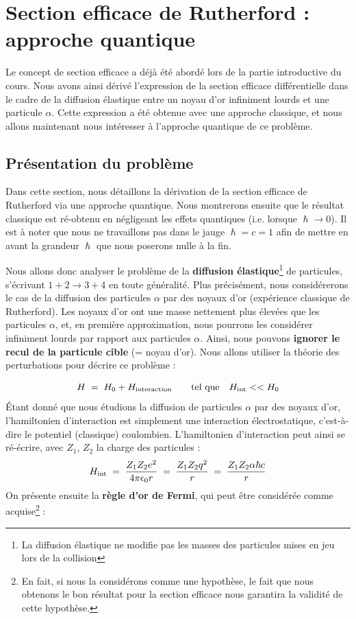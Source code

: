 

\section{Section efficace de Rutherford : approche quantique}

Le concept de section efficace a déjà été abordé lors de la partie introductive du cours. Nous avons ainsi dérivé l'expression de la section efficace différentielle dans le cadre de la diffusion élastique entre un noyau d'or infiniment lourds et une particule $\alpha$. Cette expression a été obtenue avec une approche classique, et nous allons maintenant nous intéresser à l'approche quantique de ce problème.

\subsection{Présentation du problème}

Dans cette section, nous détaillons la dérivation de la section efficace de Rutherford via une approche quantique. Nous montrerons ensuite que le résultat classique est ré-obtenu en négligeant les effets quantiques (i.e. lorsque $\hslash \rightarrow 0$). Il est à noter que nous ne travaillons pas dans le jauge $\hslash = c = 1$ afin de mettre en avant la grandeur $\hslash$ que nous poserons nulle à la fin.

Nous allons donc analyser le problème de la \textbf{diffusion élastique}\footnote{La diffusion élastique ne modifie pas les masses des particules mises en jeu lors de la collision} de particules, s'écrivant $1+2 \rightarrow 3+4$ en toute généralité. Plus précisément, nous considérerons le cas de la diffusion des particules $\alpha$ par des noyaux d'or (expérience classique de Rutherford). Les noyaux d'or ont une masse nettement plus élevées que les particules $\alpha$, et, en première approximation, nous pourrons les considérer infiniment lourds par rapport aux particules $\alpha$. Ainsi, nous pouvons \textbf{ignorer le recul de la particule cible }(= noyau d'or). Nous allons utiliser la théorie des perturbations pour décrire ce problème :

\[
    H \; = \; H_0 + H_\text{interaction} \qquad \textrm{tel que} \quad H_\text{int} << H_0
\]
Étant donné que nous étudions la diffusion de particules $\alpha$ par des noyaux d'or, l'hamiltonien d'interaction est simplement une interaction électrostatique, c'est-à-dire le potentiel (classique) coulombien. L'hamiltonien d'interaction peut ainsi se ré-écrire, avec $Z_1$, $Z_2$ la charge des particules :
\[
    H_\text{int} \; = \; 
    \dfrac{Z_1 Z_2 e^2}{4\pi \epsilon_0 r} 
    \; = \; \dfrac{Z_1 Z_2 q^2}{r} 
    \; = \; \dfrac{Z_1 Z_2 \alpha \hbar c}{r}
\]
On présente ensuite la \textbf{règle d'or de Fermi}, qui peut être considérée comme acquise\footnote{En fait, si nous la considérons comme une hypothèse, le fait que nous obtenons le bon résultat pour la section efficace nous garantira la validité de cette hypothèse.} :

